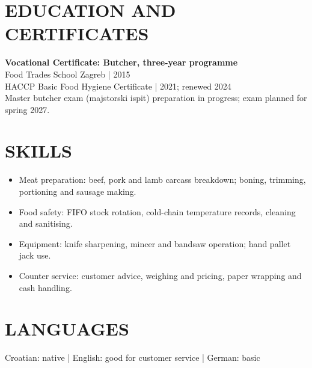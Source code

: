 \documentclass[11pt,a4paper]{article}
\begin{document}
\section*{EDUCATION AND CERTIFICATES}
\textbf{Vocational Certificate: Butcher, three-year programme}\\
Food Trades School Zagreb | 2015\\
HACCP Basic Food Hygiene Certificate | 2021; renewed 2024\\
Master butcher exam (majstorski ispit) preparation in progress; exam planned for spring 2027.

\section*{SKILLS}
\begin{itemize}
\item Meat preparation: beef, pork and lamb carcass breakdown; boning, trimming, portioning and sausage making.
\item Food safety: FIFO stock rotation, cold-chain temperature records, cleaning and sanitising.
\item Equipment: knife sharpening, mincer and bandsaw operation; hand pallet jack use.
\item Counter service: customer advice, weighing and pricing, paper wrapping and cash handling.
\end{itemize}

\section*{LANGUAGES}
Croatian: native | English: good for customer service | German: basic
\end{document}
